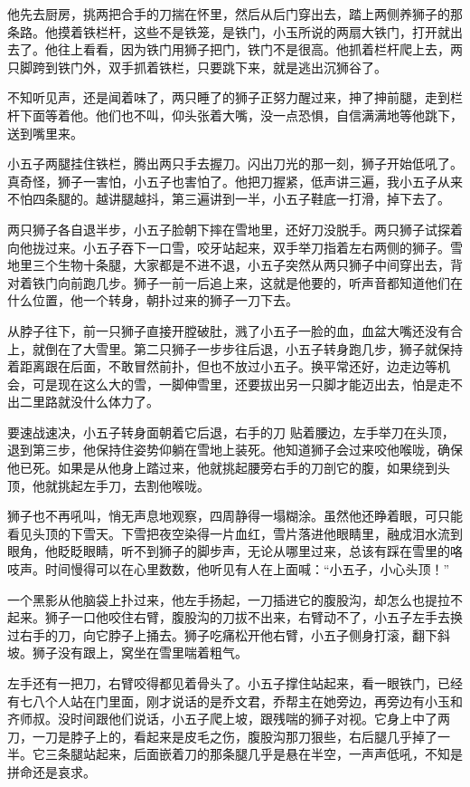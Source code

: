 他先去厨房，挑两把合手的刀揣在怀里，然后从后门穿出去，踏上两侧养狮子的那条路。他摸着铁栏杆，这些不是铁笼，是铁门，小玉所说的两扇大铁门，打开就出去了。他往上看看，因为铁门用狮子把门，铁门不是很高。他抓着栏杆爬上去，两只脚跨到铁门外，双手抓着铁栏，只要跳下来，就是逃出沉狮谷了。

不知听见声，还是闻着味了，两只睡了的狮子正努力醒过来，抻了抻前腿，走到栏杆下面等着他。他们也不叫，仰头张着大嘴，没一点恐惧，自信满满地等他跳下，送到嘴里来。

小五子两腿挂住铁栏，腾出两只手去握刀。闪出刀光的那一刻，狮子开始低吼了。真奇怪，狮子一害怕，小五子也害怕了。他把刀握紧，低声讲三遍，我小五子从来不怕四条腿的。越讲腿越抖，第三遍讲到一半，小五子鞋底一打滑，掉下去了。

两只狮子各自退半步，小五子脸朝下摔在雪地里，还好刀没脱手。两只狮子试探着向他拢过来。小五子吞下一口雪，咬牙站起来，双手举刀指着左右两侧的狮子。雪地里三个生物十条腿，大家都是不进不退，小五子突然从两只狮子中间穿出去，背对着铁门向前跑几步。狮子一前一后追上来，这就是他要的，听声音都知道他们在什么位置，他一个转身，朝扑过来的狮子一刀下去。

从脖子往下，前一只狮子直接开膛破肚，溅了小五子一脸的血，血盆大嘴还没有合上，就倒在了大雪里。第二只狮子一步步往后退，小五子转身跑几步，狮子就保持着距离跟在后面，不敢冒然前扑，但也不放过小五子。换平常还好，边走边等机会，可是现在这么大的雪，一脚伸雪里，还要拔出另一只脚才能迈出去，怕是走不出二里路就没什么体力了。

要速战速决，小五子转身面朝着它后退，右手的刀
贴着腰边，左手举刀在头顶，退到第三步，他保持住姿势仰躺在雪地上装死。他知道狮子会过来咬他喉咙，确保他已死。如果是从他身上踏过来，他就挑起腰旁右手的刀剖它的腹，如果绕到头顶，他就挑起左手刀，去割他喉咙。

狮子也不再吼叫，悄无声息地观察，四周静得一塌糊涂。虽然他还睁着眼，可只能看见头顶的下雪天。下雪把夜空染得一片血红，雪片落进他眼睛里，融成泪水流到眼角，他眨眨眼睛，听不到狮子的脚步声，无论从哪里过来，总该有踩在雪里的咯吱声。时间慢得可以在心里数数，他听见有人在上面喊：“小五子，小心头顶！”

一个黑影从他脑袋上扑过来，他左手扬起，一刀插进它的腹股沟，却怎么也提拉不起来。狮子一口他咬住右臂，腹股沟的刀拔不出来，右臂动不了，小五子左手去换过右手的刀，向它脖子上捅去。狮子吃痛松开他右臂，小五子侧身打滚，翻下斜坡。狮子没有跟上，窝坐在雪里喘着粗气。

左手还有一把刀，右臂咬得都见着骨头了。小五子撑住站起来，看一眼铁门，已经有七八个人站在门里面，刚才说话的是乔文君，乔帮主在她旁边，再旁边有小玉和齐师叔。没时间跟他们说话，小五子爬上坡，跟残喘的狮子对视。它身上中了两刀，一刀是脖子上的，看起来是皮毛之伤，腹股沟那刀狠些，右后腿几乎掉了一半。它三条腿站起来，后面嵌着刀的那条腿几乎是悬在半空，一声声低吼，不知是拼命还是哀求。


